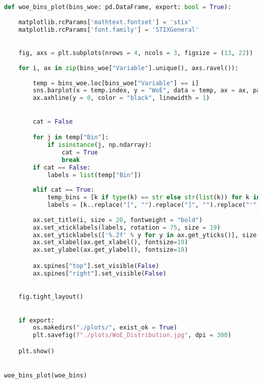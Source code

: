 \begin{lstlisting}[language=Python, basicstyle=\footnotesize\ttfamily]
def woe_bins_plot(bins_woe: pd.DataFrame, export: bool = True):
    
    matplotlib.rcParams['mathtext.fontset'] = 'stix'
    matplotlib.rcParams['font.family'] = 'STIXGeneral'
    

    fig, axs = plt.subplots(nrows = 4, ncols = 3, figsize = (13, 22))
    
    for i, ax in zip(bins_woe["Variable"].unique(), axs.ravel()):
    
        temp = bins_woe.loc[bins_woe["Variable"] == i]
        sns.barplot(x = temp.index, y = "WoE", data = temp, ax = ax, palette = "BuPu")
        ax.axhline(y = 0, color = "black", linewidth = 1)

        
        cat = False

        for j in temp["Bin"]:
            if isinstance(j, np.ndarray):
                cat = True
                break
        if cat == False:
            labels = list(temp["Bin"])
 
        elif cat == True:
            temp_bins = [k if type(k) == str else str(list(k)) for k in temp["Bin"]]
            labels = [k..replace("[", "").replace("]", "").replace("'","") for k in temp_bins]
        
        ax.set_title(i, size = 20, fontweight = "bold")
        ax.set_xticklabels(labels, rotation = 75, size = 19)
        ax.set_yticklabels(['%.2f' % y for y in ax.get_yticks()], size = 19)
        ax.set_xlabel(ax.get_xlabel(), fontsize=19)
        ax.set_ylabel(ax.get_ylabel(), fontsize=19)

        ax.spines["top"].set_visible(False)
        ax.spines["right"].set_visible(False)
    

    fig.tight_layout()

    
    if export:
        os.makedirs("./plots/", exist_ok = True)
        plt.savefig(f"./plots/WoE_Distribution.jpg", dpi = 300)

    plt.show()


woe_bins_plot(woe_bins)
\end{lstlisting}
